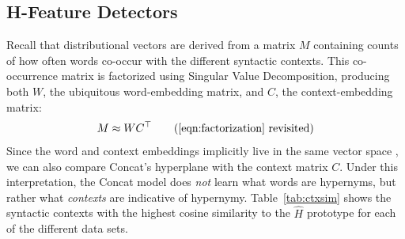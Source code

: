\subsection{H-Feature Detectors}

Recall that distributional vectors are derived from a matrix $M$ containing
counts of how often words co-occur with the different syntactic contexts. This
co-occurrence matrix is factorized using Singular Value Decomposition,
producing both $W$, the ubiquitous word-embedding matrix, and $C$, the
context-embedding matrix:
\begin{equation}
  M \approx WC^{\top}
  \tag{\ref{eqn:factorization} revisited}
\end{equation}
Since the word and context embeddings implicitly live in the same vector space
\cite{melamud:2015:vsm}, we can also compare Concat's hyperplane with the
context matrix $C$. Under this interpretation, the Concat model does {\em not}
learn what words are hypernyms, but rather what {\em contexts} are indicative
of hypernymy. Table~\ref{tab:ctxsim} shows the syntactic contexts with the
highest cosine similarity to the $\hat H$ prototype for each of the different
data sets.

